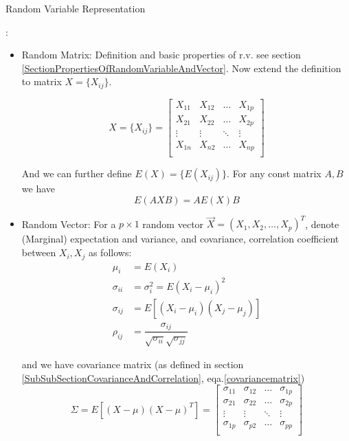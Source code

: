 \begin{point}
    \hypertarget{RandomVariableRepresentation}{Random Variable Representation}:
\end{point}
    \begin{itemize}[topsep=6pt,itemsep=4pt]
        \item Random Matrix: Definition and basic properties of r.v. see section \ref{SectionPropertiesOfRandomVariableAndVector}. Now extend the definition to matrix $ X=\{X_{ij}\} $. 
    
    \[
        X=\{X_{ij}\}=\begin{bmatrix}
        X_{11}&X_{12}&\ldots&X_{1p}\\
        X_{21}&X_{22}&\ldots&X_{2p}\\
        \vdots&\vdots&\ddots&\vdots\\
        X_{1n}&X_{n2}&\ldots&X_{np}\\
        \end{bmatrix} 
    \]

    And we can further define $ E(X)=\{E(X_{ij})\} $.
    For any const matrix $ A,B $ we have
    \[
        E(AXB)=AE(X)B 
    \]

    \item Random Vector: For a $ p\times 1 $ random vector $ \vec{X}=(X_{1},X_{2},\ldots,X_{p})^T  $, denote (Marginal) expectation and variance, and covariance, correlation coefficient between $ X_i,X_j $ as follows:
    \begin{align*}
        \mu_i&=E(X_i)\\
        \sigma _{ii}&=\sigma_i ^2=E(X_i-\mu_i)^2\\
        \sigma_{ij}&=E[(X_i-\mu_i)(X_j-\mu_j)]\\
        \rho _{ij}&=\dfrac{\sigma _{ij}}{\sqrt{\sigma _{ii}}\sqrt{\sigma _{jj}}}
    \end{align*}
    
    and we have covariance matrix (as defined in section \ref{SubSubSectionCovarianceAndCorrelation}, eqa.\ref{covariancematrix})
    \[
        \Sigma =E[(X-\mu)(X-\mu)^T] =
        \begin{bmatrix}
        \sigma _{11}&\sigma _{12}&\ldots&\sigma _{1p}\\
        \sigma _{21}&\sigma _{22}&\ldots&\sigma _{2p}\\
        \vdots&\vdots&\ddots&\vdots\\
        \sigma _{1p}&\sigma _{p2}&\ldots&\sigma _{pp}\\
        \end{bmatrix}
    \]


\end{itemize}

